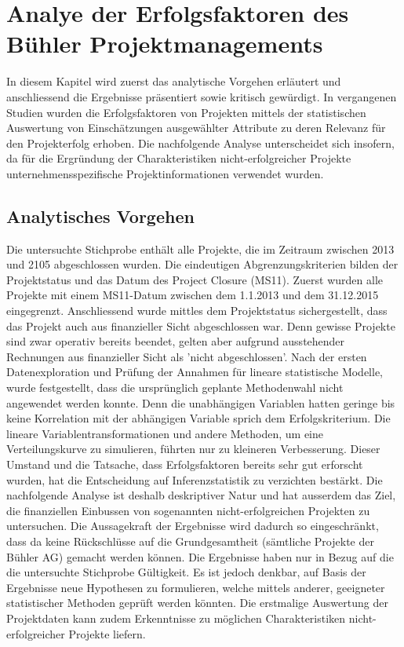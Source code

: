 \section{Analye der Erfolgsfaktoren des Bühler Projektmanagements}\label{sec:drei}
In diesem Kapitel wird zuerst das analytische Vorgehen erläutert und anschliessend die Ergebnisse präsentiert sowie kritisch gewürdigt. In vergangenen Studien wurden die Erfolgsfaktoren von Projekten mittels der statistischen Auswertung von Einschätzungen ausgewählter Attribute zu deren Relevanz für den Projekterfolg erhoben. Die nachfolgende Analyse unterscheidet sich insofern, da für die Ergründung der Charakteristiken nicht-erfolgreicher Projekte unternehmensspezifische Projektinformationen verwendet wurden.
\subsection{Analytisches Vorgehen}\label{sec:dreieins}
Die untersuchte Stichprobe enthält alle Projekte, die im Zeitraum zwischen 2013 und 2105 abgeschlossen wurden. Die eindeutigen Abgrenzungskriterien bilden der Projektstatus und das Datum des Project Closure (MS11). Zuerst wurden alle Projekte mit einem MS11-Datum zwischen dem 1.1.2013 und dem 31.12.2015 eingegrenzt. Anschliessend wurde mittles dem Projektstatus sichergestellt, dass das Projekt auch aus finanzieller Sicht abgeschlossen war. Denn gewisse Projekte sind zwar operativ bereits beendet, gelten aber aufgrund ausstehender Rechnungen aus finanzieller Sicht als 'nicht abgeschlossen'.
\newline Nach der ersten Datenexploration und Prüfung der Annahmen für lineare statistische Modelle, wurde festgestellt, dass die ursprünglich geplante Methodenwahl nicht angewendet werden konnte. Denn die unabhängigen Variablen hatten geringe bis keine Korrelation mit der abhängigen Variable sprich dem Erfolgskriterium. Die lineare Variablentransformationen und andere Methoden, um eine Verteilungskurve zu simulieren, führten nur zu kleineren Verbesserung. Dieser Umstand und die Tatsache, dass Erfolgsfaktoren bereits sehr gut erforscht wurden, hat die Entscheidung auf Inferenzstatistik zu verzichten bestärkt. Die nachfolgende Analyse ist deshalb deskriptiver Natur und hat ausserdem das Ziel, die finanziellen Einbussen von sogenannten nicht-erfolgreichen Projekten zu untersuchen. Die Aussagekraft der Ergebnisse wird dadurch so eingeschränkt, dass da keine Rückschlüsse auf die Grundgesamtheit (sämtliche Projekte der Bühler AG) gemacht werden können.  Die Ergebnisse haben nur in Bezug auf die die untersuchte Stichprobe Gültigkeit. Es ist jedoch denkbar, auf Basis der Ergebnisse neue Hypothesen zu formulieren, welche mittels anderer, geeigneter statistischer Methoden geprüft werden könnten. Die erstmalige Auswertung der Projektdaten kann zudem Erkenntnisse zu möglichen Charakteristiken nicht-erfolgreicher Projekte liefern.
